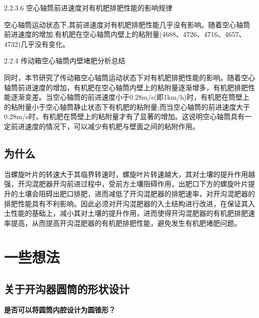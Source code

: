 \documentclass{article}
\begin{document}
\begin{tcolorbox}
	2.2.3.6 空心轴筒前进速度对有机肥排肥性能的影响规律
	
	空心轴筒运动状态下,其前进速度对有机肥排肥性能几乎没有影响。随着空心轴筒前进速度的增加,有机肥在空心轴筒内壁上的粘附量(4688、4726、4716、4657、4732)几乎没有变化。
	
	2.2.4 传动箱空心轴筒内壁堵肥分析总结
	
	同时，本节研究了传动箱空心轴筒运动状态下对有机肥排肥性能的影响。随着空心轴筒前进速度的增加，有机肥在空心轴筒内壁上的粘附量逐渐增多，有机肥排肥性能逐渐变差。当空心轴筒的前进速度小于0.28m/s(即1km/h)时，有机肥在筒壁上的粘附量小于空心轴筒静止状态下有机肥的粘附量;而当空心轴筒的前进速度大于0.28m/s时，有机肥在筒壁上的粘附量才有了显著的增加。这说明空心轴筒具有一定前进速度的情况下，可以减少有机肥与壁面之间的粘附作用。
	
\end{tcolorbox}

\subsection{为什么}

\begin{tcolorbox}
	当螺旋叶片的转速大于其临界转速时，螺旋叶片转速越大，其对土壤的提升作用越强，开沟混肥器开沟前进过程中，受前方土壤阻碍作用，出肥口下方的螺旋叶片提升的土壤会阻碍出肥口排肥，进而减低了开沟混肥器的排肥速率，对开沟混肥器的排肥性能具有不利影响。因此必须对开沟混肥器的入土结构进行改进，在保证其入土性能的基础上，减小其对土壤的提升作用，进而使得开沟混肥器的有机肥排肥速率提高，从而提高开沟混肥器的有机肥排肥性能，避免发生有机肥堵肥问题。
	
\end{tcolorbox}

\section{一些想法}

\subsection{关于开沟器圆筒的形状设计}

\textbf{是否可以将圆筒内腔设计为圆锥形？}
\end{document}
